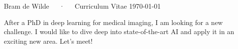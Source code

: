 \documentclass[11pt, a4paper]{awesome-cv}
\begin{document}
\makecvheader

\makecvfooter
  {}
  {Bram de Wilde~~~·~~~Curriculum Vitae}
  {\today}


After a PhD in deep learning for medical imaging, I am looking for a new challenge. I would like to dive deep into state-of-the-art AI and apply it in an exciting new area. Let's meet!








\end{document}
